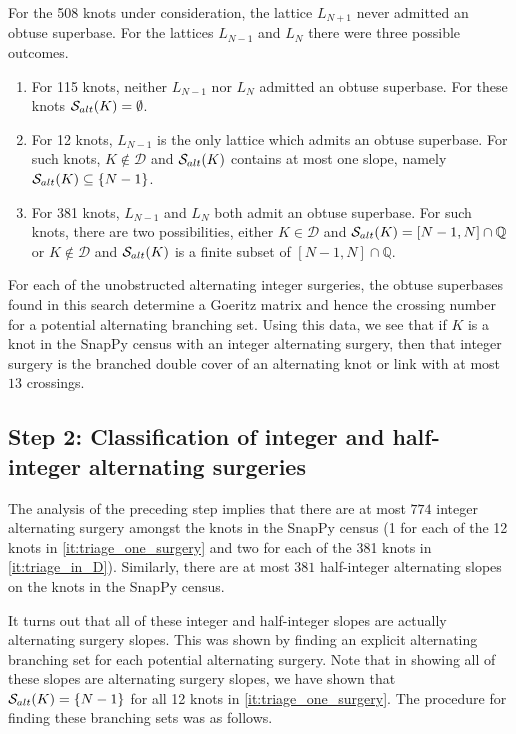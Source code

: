 \documentclass{amsart} %
\newcommand{\D}{\mathcal{D}}
\newcommand{\Q}{\mathbb{Q}}
\newcommand{\Salt}{\mathcal{S}_{\rm alt}}
\theoremstyle{thm}
\theoremstyle{definition}
\numberwithin{equation}{section}
\begin{document}
For the 508 knots under consideration, the lattice $L_{N+1}$ never admitted an obtuse superbase. For the lattices $L_{N-1}$ and $L_{N}$ there were three possible outcomes.
\begin{enumerate}
    \item For 115 knots, neither $L_{N-1}$ nor $L_N$ admitted an obtuse superbase. For these knots $\Salt(K)=\emptyset$.
    \item\label{it:triage_one_surgery} For 12 knots, $L_{N-1}$ is the only lattice which admits an obtuse superbase. For such knots, $K\not\in \D$ and $\Salt(K)$ contains at most one slope, namely $\Salt(K)\subseteq\{N-1\}$.
    \item\label{it:triage_in_D} For 381 knots, $L_{N-1}$ and $L_N$ both admit an obtuse superbase. For such knots, there are two possibilities, either $K\in \D$ and $\Salt(K)=[N-1,N]\cap \Q$ or $K\not\in \D$ and $\Salt(K)$ is a finite subset of $[N-1,N]\cap \Q$.
\end{enumerate}
For each of the unobstructed alternating integer surgeries, the obtuse superbases found in this search determine a Goeritz matrix and hence the crossing number for a potential alternating branching set. Using this data, we see that if $K$ is a knot in the SnapPy census with an integer alternating surgery, then that integer surgery is the branched double cover of an alternating knot or link with at most $13$ crossings.

\subsection*{Step 2: Classification of integer and half-integer alternating surgeries}\label{sec:search_for_alt}
The analysis of the preceding step implies that there are at most $774$ integer alternating surgery amongst the knots in the SnapPy census (1 for each of the 12 knots in \eqref{it:triage_one_surgery} and two for each of the 381 knots in \eqref{it:triage_in_D}). Similarly, there are at most $381$ half-integer alternating slopes on the knots in the SnapPy census.

It turns out that all of these integer and half-integer slopes are actually alternating surgery slopes. This was shown by finding an explicit alternating branching set for each potential alternating surgery. Note that in showing all of these slopes are alternating surgery slopes, we have shown that $\Salt(K)=\{N-1\}$ for all 12 knots in \eqref{it:triage_one_surgery}. The procedure for finding these branching sets was as follows.
\end{document}
